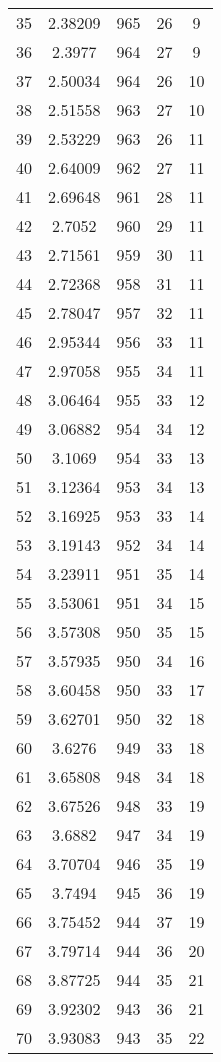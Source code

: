 \documentclass[12pt,a4paper]{article}
\begin{document}
\begin{tabular}{r|cccc}
	35 & 2.38209 & 965 & 26 & 9 \\
	36 & 2.3977 & 964 & 27 & 9 \\
	37 & 2.50034 & 964 & 26 & 10 \\
	38 & 2.51558 & 963 & 27 & 10 \\
	39 & 2.53229 & 963 & 26 & 11 \\
	40 & 2.64009 & 962 & 27 & 11 \\
	41 & 2.69648 & 961 & 28 & 11 \\
	42 & 2.7052 & 960 & 29 & 11 \\
	43 & 2.71561 & 959 & 30 & 11 \\
	44 & 2.72368 & 958 & 31 & 11 \\
	45 & 2.78047 & 957 & 32 & 11 \\
	46 & 2.95344 & 956 & 33 & 11 \\
	47 & 2.97058 & 955 & 34 & 11 \\
	48 & 3.06464 & 955 & 33 & 12 \\
	49 & 3.06882 & 954 & 34 & 12 \\
	50 & 3.1069 & 954 & 33 & 13 \\
	51 & 3.12364 & 953 & 34 & 13 \\
	52 & 3.16925 & 953 & 33 & 14 \\
	53 & 3.19143 & 952 & 34 & 14 \\
	54 & 3.23911 & 951 & 35 & 14 \\
	55 & 3.53061 & 951 & 34 & 15 \\
	56 & 3.57308 & 950 & 35 & 15 \\
	57 & 3.57935 & 950 & 34 & 16 \\
	58 & 3.60458 & 950 & 33 & 17 \\
	59 & 3.62701 & 950 & 32 & 18 \\
	60 & 3.6276 & 949 & 33 & 18 \\
	61 & 3.65808 & 948 & 34 & 18 \\
	62 & 3.67526 & 948 & 33 & 19 \\
	63 & 3.6882 & 947 & 34 & 19 \\
	64 & 3.70704 & 946 & 35 & 19 \\
	65 & 3.7494 & 945 & 36 & 19 \\
	66 & 3.75452 & 944 & 37 & 19 \\
	67 & 3.79714 & 944 & 36 & 20 \\
	68 & 3.87725 & 944 & 35 & 21 \\
	69 & 3.92302 & 943 & 36 & 21 \\
	70 & 3.93083 & 943 & 35 & 22 \\

\end{tabular}
\end{document}
